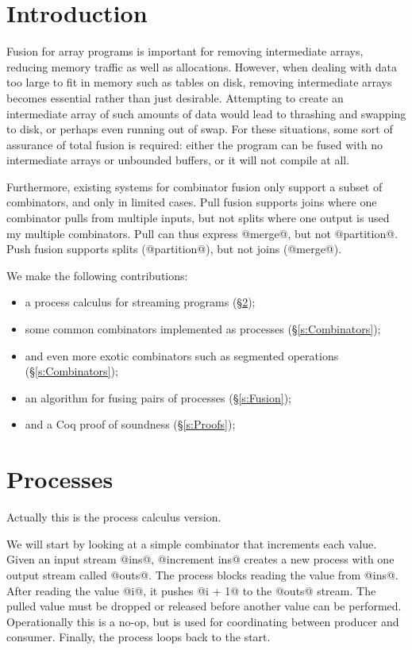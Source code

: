\section{Introduction}
\label{s:Introduction}

Fusion for array programs is important for removing intermediate arrays, reducing memory traffic as well as allocations.
However, when dealing with data too large to fit in memory such as tables on disk, removing intermediate arrays becomes essential rather than just desirable.
Attempting to create an intermediate array of such amounts of data would lead to thrashing and swapping to disk, or perhaps even running out of swap.
For these situations, some sort of assurance of total fusion is required: either the program can be fused with no intermediate arrays or unbounded buffers, or it will not compile at all.

Furthermore, existing systems for combinator fusion only support a subset of combinators, and only in limited cases.
Pull fusion supports joins where one combinator pulls from multiple inputs, but not splits where one output is used my multiple combinators.
Pull can thus express @merge@, but not @partition@.
Push fusion supports splits (@partition@), but not joins (@merge@).

We make the following contributions:
\begin{itemize}
\item a process calculus for streaming programs (\S\ref{s:Process});
\item some common combinators implemented as processes (\S\ref{s:Combinators});
\item and even more exotic combinators such as segmented operations (\S\ref{s:Combinators});
\item an algorithm for fusing pairs of processes (\S\ref{s:Fusion});
\item and a Coq proof of soundness (\S\ref{s:Proofs});
\end{itemize}


\section{Processes}
\label{s:Process}
Actually this is the process calculus version.

We will start by looking at a simple combinator that increments each value.
Given an input stream @ins@, @increment ins@ creates a new process with one output stream called @outs@.
The process blocks reading the value from @ins@.
After reading the value @i@, it pushes @i + 1@ to the @outs@ stream.
The pulled value must be dropped or released before another value can be performed.
Operationally this is a no-op, but is used for coordinating between producer and consumer.
Finally, the process loops back to the start.

